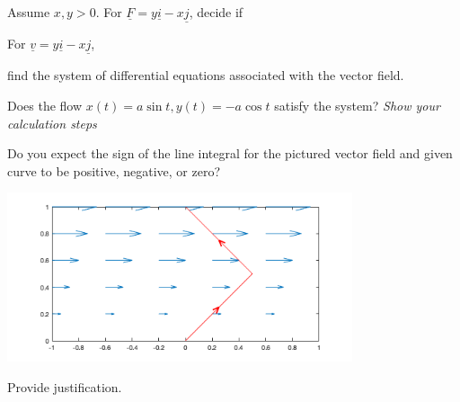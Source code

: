 \documentclass[12pt,letterpaper,noanswers]{exam}
\newcommand{\mb}[1]{\underline{#1}}
\begin{document}
 \pdfpageheight 11in 
  \pdfpagewidth 8.5in



\begin{questions}
\question Assume $x,y>0$.  For $\mb F = y\mb i-x\mb j$, decide if

\vspace{0.5in}

\item For $\mb v = y\mb i - x\mb j$,
\begin{parts}
\item find the system of differential equations associated with the vector field.
\vspace{0.6in}
\item Does the flow $x(t) = a\sin t, y(t) = -a\cos t$ satisfy the system?  \emph{Show your calculation steps}
\end{parts}
\vfill

\item Do you expect the sign of the line integral for the pictured vector field and given curve to be positive, negative, or zero?

\includegraphics[width=4in]{img/C21lineintegral-p2.png}

Provide justification.

\vfill

\end{questions}
\end{document}
